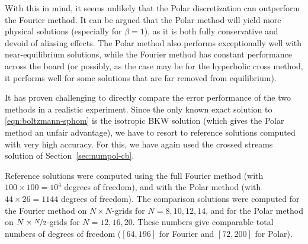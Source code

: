 With this in mind, it seems unlikely that the Polar discretization can outperform the Fourier method. It can
be argued that the Polar method will yield more physical solutions (especially for $\beta=1$), as it is both
fully conservative and devoid of aliasing effects. The Polar method also performs exceptionally well with
near-equilibrium solutions, while the Fourier method has constant performance across the board (or possibly,
as the case may be for the hyperbolic cross method, it performs well for some solutions that are far removed
from equilibrium).

It has proven challenging to directly compare the error performance of the two methods in a realistic
experiment. Since the only known exact solution to \eqref{eqn:boltzmann-sphom} is the isotropic BKW solution
(which gives the Polar method an unfair advantage), we have to resort to reference solutions computed with
very high accuracy. For this, we have again used the crossed streams solution of Section~\vref{sec:numpol-cb}.

Reference solutions were computed using the full Fourier method (with $100\times100=10^4$ degrees of freedom),
and with the Polar method (with $44\times26=1144$ degrees of freedom). The comparison solutions were computed
for the Fourier method on $N\times N$-grids for $N=8,10,12,14$, and for the Polar method on
$N\times\nicefrac{N}{2}$-grids for $N=12,16,20$. These numbers give comparable total numbers of degrees of
freedom ($[64,196]$ for Fourier and $[72,200]$ for Polar).

